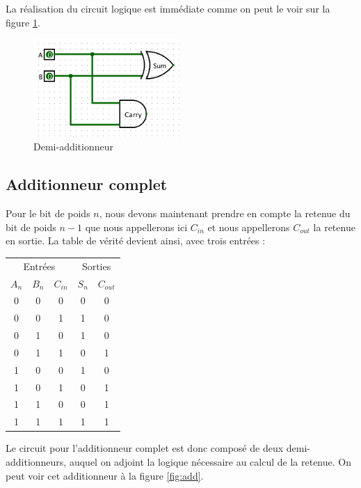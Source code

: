 \documentclass{book}
\theoremstyle{definition}
\theoremstyle{definition}
\begin{document}
La réalisation du circuit logique est immédiate comme on peut le voir sur la figure \ref{fig:demiadd}.


\begin{figure}
\includegraphics[width=0.5\textwidth]{media/SysLogiques/DemiAdd.png}
    \centering
    \caption{Demi-additionneur}
    \label{fig:demiadd}
\end{figure}


\subsection{Additionneur complet}
Pour le bit de poids $n$, nous devons maintenant prendre en compte la retenue du bit de poids $n-1$ que nous appellerons ici $C_{in}$ et nous appellerons $C_{out}$ la retenue en sortie. La table de vérité devient ainsi, avec trois entrées :
\\

  \begin{tabular}{|c|c|c||c|c|}
    \hline
         \multicolumn{3}{|c||}{Entrées}& \multicolumn{2}{c|}{Sorties}\\
        
         $A_n$ & $B_n$ & $C_{in}$ & $S_n$ & $C_{out}$ \\
    \hline 
        0 & 0 & 0 & 0 & 0\\
        0 & 0 & 1 & 1 & 0\\
        0 & 1 & 0 & 1 & 0\\
        0 & 1 & 1 & 0 & 1\\
        1 & 0 & 0 & 1 & 0\\
        1 & 0 & 1 & 0 & 1\\
        1 & 1 & 0 & 0 & 1\\
        1 & 1 & 1 & 1 & 1\\
    \hline
  \end{tabular}

Le circuit pour l'additionneur complet est donc composé de deux demi-additionneurs, auquel on adjoint la logique nécessaire au calcul de la retenue. On peut voir cet additionneur à la figure \ref{fig:add}.
\end{document}
